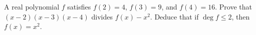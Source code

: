 A real polynomial $f$ satisfies $f(2)=4$, $f(3)=9$, and $f(4)=16$. Prove that $(x-2)(x-3)(x-4)$ divides $f(x)-x^2$. Deduce that if $\deg f\le2$, then $f(x)=x^2$.
